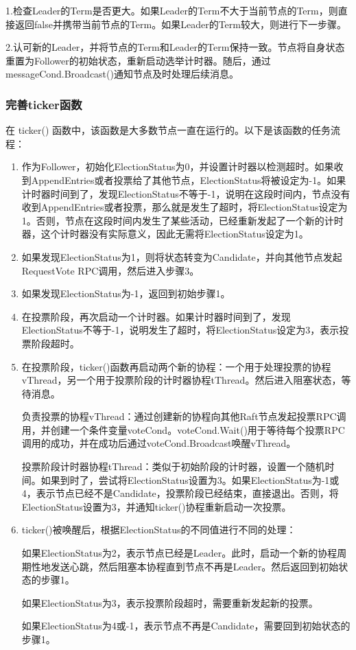 \documentclass[]{article}
\begin{document}
	1.检查Leader的Term是否更大。如果Leader的Term不大于当前节点的Term，则直接返回false并携带当前节点的Term。如果Leader的Term较大，则进行下一步骤。
	
	2.认可新的Leader，并将节点的Term和Leader的Term保持一致。节点将自身状态重置为Follower的初始状态，重新启动选举计时器。随后，通过messageCond.Broadcast()通知节点及时处理后续消息。
	
	\subsubsection{完善ticker函数}
	在 ticker() 函数中，该函数是大多数节点一直在运行的。以下是该函数的任务流程：
	\begin{enumerate}
	\item 作为Follower，初始化ElectionStatus为0，并设置计时器以检测超时。如果收到AppendEntries或者投票给了其他节点，ElectionStatus将被设定为-1。如果计时器时间到了，发现ElectionStatus不等于-1，说明在这段时间内，节点没有收到AppendEntries或者投票，那么就是发生了超时，将ElectionStatus设定为1。否则，节点在这段时间内发生了某些活动，已经重新发起了一个新的计时器，这个计时器没有实际意义，因此无需将ElectionStatus设定为1。
	
	\item 如果发现ElectionStatus为1，则将状态转变为Candidate，并向其他节点发起RequestVote RPC调用，然后进入步骤3。
	
	\item 如果发现ElectionStatus为-1，返回到初始步骤1。
	
	\item 在投票阶段，再次启动一个计时器。如果计时器时间到了，发现ElectionStatus不等于-1，说明发生了超时，将ElectionStatus设定为3，表示投票阶段超时。
	
	\item 在投票阶段，ticker()函数再启动两个新的协程：一个用于处理投票的协程vThread，另一个用于投票阶段的计时器协程tThread。然后进入阻塞状态，等待消息。
	
	负责投票的协程vThread：通过创建新的协程向其他Raft节点发起投票RPC调用，并创建一个条件变量voteCond。voteCond.Wait()用于等待每个投票RPC调用的成功，并在成功后通过voteCond.Broadcast唤醒vThread。
	
	投票阶段计时器协程tThread：类似于初始阶段的计时器，设置一个随机时间。如果到时了，尝试将ElectionStatus设置为3。如果ElectionStatus为-1或4，表示节点已经不是Candidate，投票阶段已经结束，直接退出。否则，将ElectionStatus设置为3，并通知ticker()协程重新启动一次投票。
	
	\item ticker()被唤醒后，根据ElectionStatus的不同值进行不同的处理：
	
	如果ElectionStatus为2，表示节点已经是Leader。此时，启动一个新的协程周期性地发送心跳，然后阻塞本协程直到节点不再是Leader。然后返回到初始状态的步骤1。
	
	如果ElectionStatus为3，表示投票阶段超时，需要重新发起新的投票。
	
	如果ElectionStatus为4或-1，表示节点不再是Candidate，需要回到初始状态的步骤1。
	\end{enumerate}
\end{document}
